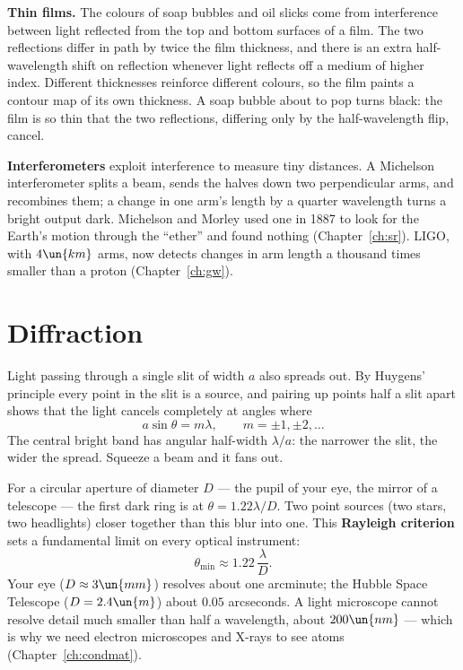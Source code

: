 \textbf{Thin films.} The colours of soap bubbles and oil slicks come from interference between light reflected from the top and bottom surfaces of a film. The two reflections differ in path by twice the film thickness, and there is an extra half-wavelength shift on reflection whenever light reflects off a medium of higher index. Different thicknesses reinforce different colours, so the film paints a contour map of its own thickness. A soap bubble about to pop turns black: the film is so thin that the two reflections, differing only by the half-wavelength flip, cancel.

\textbf{Interferometers} exploit interference to measure tiny distances. A Michelson interferometer splits a beam, sends the halves down two perpendicular arms, and recombines them; a change in one arm's length by a quarter wavelength turns a bright output dark. Michelson and Morley used one in 1887 to look for the Earth's motion through the ``ether'' and found nothing (Chapter~\ref{ch:sr}). LIGO, with $4\un{km}$ arms, now detects changes in arm length a thousand times smaller than a proton (Chapter~\ref{ch:gw}).

\section{Diffraction}
\label{sec:diffraction}

Light passing through a single slit of width $a$ also spreads out. By Huygens' principle every point in the slit is a source, and pairing up points half a slit apart shows that the light cancels completely at angles where
\[
  a\sin\theta = m\lambda, \qquad m = \pm1,\pm2,\dots
\]
The central bright band has angular half-width $\lambda/a$: the narrower the slit, the wider the spread. Squeeze a beam and it fans out.

For a circular aperture of diameter $D$ --- the pupil of your eye, the mirror of a telescope --- the first dark ring is at $\theta = 1.22\lambda/D$. Two point sources (two stars, two headlights) closer together than this blur into one. This \textbf{Rayleigh criterion} sets a fundamental limit on every optical instrument:
\[
  \theta_{\min}\approx 1.22\,\frac{\lambda}{D}.
\]
Your eye ($D\approx3\un{mm}$) resolves about one arcminute; the Hubble Space Telescope ($D = 2.4\un{m}$) about $0.05$ arcseconds. A light microscope cannot resolve detail much smaller than half a wavelength, about $200\un{nm}$ --- which is why we need electron microscopes and X-rays to see atoms (Chapter~\ref{ch:condmat}).

